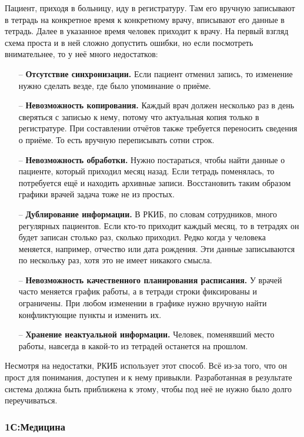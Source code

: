 \documentclass[a4paper,article]{article}
\begin{document}
        Пациент, приходя в больницу, иду в регистратуру. Там его вручную записывают в тетрадь на конкретное время к конкретному врачу, вписывают его данные в тетрадь. Далее в указанное время человек приходит к врачу.
        На первый взгляд схема проста и в ней сложно допустить ошибки, но если посмотреть внимательнее, то у неё много недостатков:

        \begin{itemize}[nolistsep]
            \item[--] \textbf{Отсутствие синхронизации.} Если пациент отменил запись, то изменение нужно сделать везде, где было упоминание о приёме.
            \item[--] \textbf{Невозможность копирования.} Каждый врач должен несколько раз в день сверяться с записью к нему, потому что актуальная копия только в регистратуре. При составлении отчётов также требуется переносить сведения о приёме. То есть вручную переписывать сотни строк.
            \item[--] \textbf{Невозможность обработки.} Нужно постараться, чтобы найти данные о пациенте, который приходил месяц назад. Если тетрадь поменялась, то потребуется ещё и находить архивные записи. Восстановить таким образом графики врачей задача тоже не из простых.
            \item[--] \textbf{Дублирование информации.} В РКИБ, по словам сотрудников, много регулярных пациентов. Если кто-то приходит каждый месяц, то в тетрадях он будет записан столько раз, сколько приходил. Редко когда у человека меняется, например, отчество или дата рождения. Эти данные записываются по нескольку раз, хотя это не имеет никакого смысла.
            \item[--] \textbf{Невозможность качественного планирования расписания.} У врачей часто меняется график работы, а в тетради строки фиксированы и ограничены. При любом изменении в графике нужно вручную найти конфликтующие пункты и изменить их.
            \item[--] \textbf{Хранение неактуальной информации.} Человек, поменявший место работы, навсегда в какой-то из тетрадей останется на прошлом.
        \end{itemize}

        Несмотря на недостатки, РКИБ использует этот способ. Всё из-за того, что он прост для понимания, доступен и к нему привыкли. Разработанная в результате система должна быть приближена к этому, чтобы под неё не нужно было долго переучиваться.

    \subsubsection{1С:Медицина}
\end{document}
